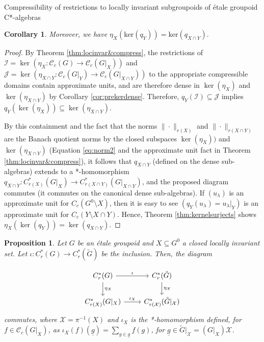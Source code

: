 \documentclass[a4paper, 12pt]{amsart}
\newtheorem{cor}[thm]{Corollary}
\newtheorem{prp}[thm]{Proposition}
\theoremstyle{definition}
\theoremstyle{remark}
\numberwithin{equation}{section}
\begin{document}
\begin{section}{Compressibility of restrictions to locally invariant subgroupoids of \'etale groupoid C*-algebras}
\begin{cor}
Moreover, we have $\eta_{X}(\text{ker}(q_{Y})) = \text{ker}(q_{X\cap Y}).$
\end{cor}

\begin{proof}
    By Theorem \ref{thm:locinvar&compress}, the restrictions of $\mathcal{I} = \ker(\eta_{X}:\mathscr{C}_{c}(G)\to \mathscr{C}_{c}(G|_{X}))$ and $\mathcal{J} = \ker(\eta_{X\cap Y}:\mathscr{C}_{c}(G|_{Y})\to \mathscr{C}_{c}(G|_{X\cap Y}))$ to the appropriate compressible domains contain approximate units, and are therefore dense in $\ker(\eta_{X})$ and $\ker(\eta_{X\cap Y})$ by Corollary \ref{cor:prekerdense}. Therefore, $q_{Y}(\mathcal{I})\subseteq \mathcal{J}$ implies $q_{Y}(\ker(\eta_{X}))\subseteq \ker(\eta_{X\cap Y})$.
    
    By this containment and the fact that the norms $\|\cdot\|_{r(X)}$ and $\|\cdot\|_{r(X\cap Y)}$ are the Banach quotient norms by the closed subspaces $\ker(\eta_{X}))$ and $\ker(\eta_{X\cap Y})$ (Equation \ref{eq:norm2} and the approximate unit fact in Theorem \ref{thm:locinvar&compress}), it follows that $q_{X\cap Y}$ (defined on the dense sub-algebras) extends to a *-homomorphism $q_{X\cap Y}: C^{*}_{r(X)}(G|_{X})\to C^{*}_{r(X\cap Y)}(G|_{X\cap Y})$, and the proposed diagram commutes (it commutes on the canonical dense sub-algebras). If $(u_{\lambda})$ is an approximate unit for $C_{c}(G^{0}\setminus X)$, then it is easy to see $(q_{Y}(u_{\lambda}) = u_{\lambda}|_{Y})$ is an approximate unit for $C_{c}(Y\setminus X\cap Y)$. Hence, Theorem \ref{thm:kernelsurjects} shows $\eta_{X}(\ker(q_{Y})) = \ker(q_{X\cap Y})$.
\end{proof}

\begin{prp}
\label{prp:commdiagcover}
    Let $G$ be an \'etale groupoid and $X\subseteq G^{0}$ a closed locally invariant set. Let $\iota:C^{*}_{r}(G)\to C^{*}_{r}(\tilde{G})$ be the inclusion. Then, the diagram

    $$ \begin{tikzcd}
C^{*}_{r}(G) \arrow[r, "\iota"] \arrow[d, "\eta_{X}"] & C^{*}_{r}(\tilde{G}) \arrow[d, "\eta_{\mathcal{X}}"] \\
C_{r(X)}^{*}(G|_{X}) \arrow[r, "\iota_{X}"]           & C^{*}_{r(\mathcal{X})}(\tilde{G}|_{\mathcal{X}})    
\end{tikzcd}$$ commutes, where $\mathcal{X} = \pi^{-1}(X)$ and $\iota_{X}$ is the *-homomorphism defined, for $f\in \mathscr{C}_{c}(G|_{X})$, as  $\iota_{X}(f)(\underline{g}) = \sum_{g\in\underline{g}}f(g)$, for $\underline{g}\in \tilde{G}|_{\mathcal{X}} = (G|_{X})\mathcal{X}$.


\end{prp}
\end{section}
\end{document}
